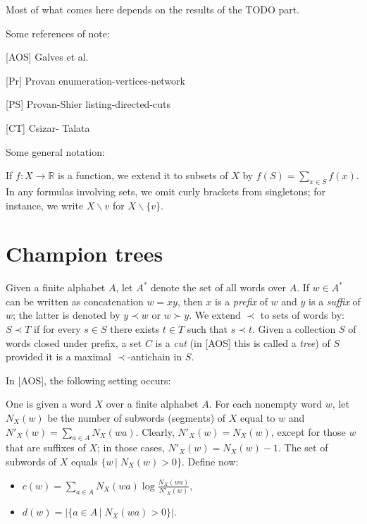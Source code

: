 \documentclass[12pt]{article}
\newcommand{\R}{\ensuremath{\mathbb{R}}\xspace}
\newcommand{\conj}[2]{\ensuremath{\{#1\,|\;#2\}}}
\begin{document}
Most of what comes here depends on the results of the TODO part.

Some references of note:

[AOS] Galves et al.

[Pr] Provan enumeration-vertices-network

[PS] Provan-Shier listing-directed-cuts

[CT] Csizar- Talata

Some general notation:

If \(f:X\rightarrow \R\) is a function, we extend it to subsets of \(X\) by
\(f(S)=\sum_{x\in S}f(x)\).  In any formulas involving sets, we omit curly
brackets from singletons; for instance, we write \(X\backslash v\) for
\(X\backslash \{v\}\).


\section{Champion trees}\label{sec:champion-trees}

Given a finite alphabet \(A\), let \(A^*\) denote the set of all words over
\(A\).  If \(w\in A^*\) can be written as concatenation \(w=xy\), then \(x\)
is a \emph{prefix} of \(w\) and \(y\) is a \emph{suffix} of \(w\); the latter
is denoted by \(y\prec w\) or \(w\succ y\).  We extend \(\prec\) to sets of
words by: \(S \prec T\) if for every \(s\in S\) there exists \(t\in T\) such
that \(s\prec t\).  Given a collection \(S\) of words closed under prefix, a
set \(C\) is a \emph{cut} (in [AOS] this is called a \emph{tree}) of \(S\)
provided it is a maximal \(\prec\)-antichain in \(S\).

In [AOS], the following setting occurs:

One is given a word \(X\) over a finite alphabet \(A\).  For each nonempty
word \(w\), let \(N_X(w)\) be the number of subwords (segments) of \(X\) equal
to \(w\) and \(N'_X(w)=\sum_{a\in A}N_X(wa)\). Clearly, \(N'_X(w)=N_X(w)\),
except for those \(w\) that are suffixes of \(X\); in those cases,
\(N'_X(w)=N_X(w)-1\).  The set of subwords of \(X\) equals \conj{w}{N_X(w)>0}.
Define now:
\begin{itemize}
    \item \(c(w) = \sum_{a\in A}N_X(wa)\log \frac{N_X(wa)}{N'_X(w)}\),
    \item \(d(w) = |\conj{a\in A}{N_X(wa)>0}|\).
\end{itemize}
\end{document}
